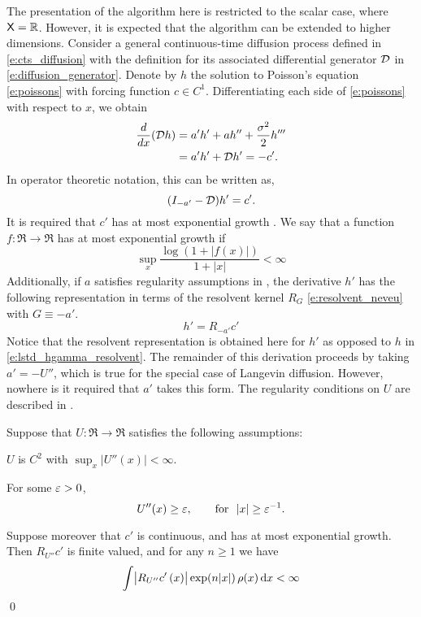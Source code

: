 The presentation of the algorithm here is restricted to the scalar case, where ${\sf X} = \mathbb{R}$. However, it is expected that the algorithm can be extended to higher dimensions. 
Consider a general continuous-time diffusion process defined in \eqref{e:cts_diffusion} with the definition for its associated differential generator ${\cal D}$ in \eqref{e:diffusion_generator}. Denote by $h$ the solution to Poisson's equation \eqref{e:poissons} with forcing function $c \in C^1$.  Differentiating each side of \eqref{e:poissons} with respect to $x$, we obtain
\begin{equation}
\begin{aligned}
\frac{d}{dx} ({\cal D} h) & = a'h' + ah'' + \frac{\sigma^2}{2} h''' \\
&  = 	a'h' + {\cal D} h'  = -c'.
\end{aligned}
\end{equation}
In operator theoretic notation, this can be written as,
\begin{equation}
(I_{-a'} - {\cal D})h' = c'.
\end{equation}
It is required that $c'$ has at most exponential growth \cite{devkonmey17b}. We say that a function $f\colon\Re\to\Re$ has at most exponential growth if
\begin{equation}
\sup_x  \frac{ \log(1+|f(x)|)}{1+|x|}  <\infty
\end{equation}
Additionally, if $a$ satisfies regularity assumptions in , the derivative $h'$ has the following representation in terms of the resolvent kernel $R_G$ \eqref{e:resolvent_neveu} with $G \equiv -a'$. 
\begin{equation}
h' = R_{-a'} c'
\label{e:gradTD_h'_resolvent}
\end{equation}
Notice that the resolvent representation is obtained here for $h'$ as opposed to $h$ in \eqref{e:lstd_hgamma_resolvent}. The remainder of this derivation proceeds by taking $a' = -U''$, which is true for the special case of Langevin diffusion. However, nowhere is it required that $a'$ takes this form. The regularity conditions on $U$ are described in .
\begin{proposition}
	\label{prop:regularity_U}
	Suppose that $U\colon\Re\to\Re$ satisfies the following assumptions:
	\begin{romannum}
		\item $U$ is $C^2$ with $\sup_x |U''(x)| <\infty$.
		\item  For some $\varepsilon>0$,
		\begin{equation}
		U''(x) \ge \varepsilon,\qquad \text{for} \ \ |x|\ge \varepsilon^{-1}.
		\end{equation}
	\end{romannum}
	Suppose moreover that $c'$ is continuous, and has at most exponential growth.
	Then $ R_{U''} c'$ is finite valued, and for any $n\ge 1$ we have
	\begin{equation}
	\int   \bigl|  R_{U''} c'\, (x) \bigr|\exp(n |x|)  \, \rho(x) \,\textmd{d} x  <\infty
	\end{equation}
	\qed
\end{proposition}

